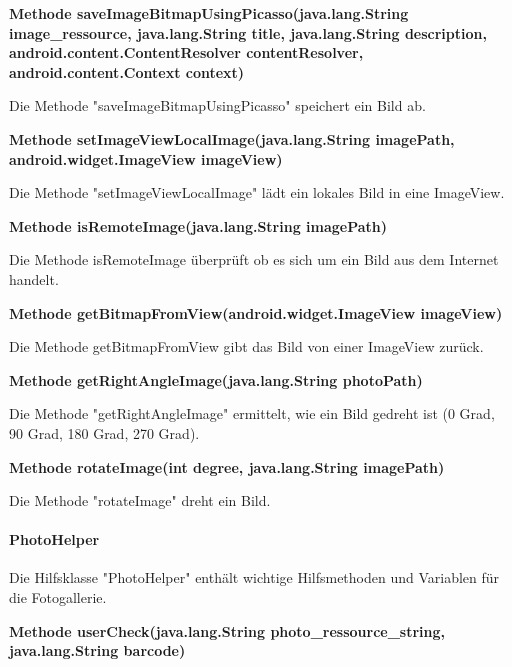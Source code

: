 \documentclass{scrartcl}
\begin{document}
\noindent\textbf{Methode saveImageBitmapUsingPicasso(java.lang.String image\_ressource, \newline 
java.lang.String title,
java.lang.String description, \newline 
android.content.ContentResolver contentResolver, \newline 
android.content.Context context)}

\noindent Die Methode "saveImageBitmapUsingPicasso" speichert ein Bild ab. \newline 

\noindent\textbf{Methode setImageViewLocalImage(java.lang.String imagePath, \newline android.widget.ImageView imageView)}

\noindent Die Methode "setImageViewLocalImage" lädt ein lokales Bild in eine ImageView. \newline 

\noindent\textbf{Methode isRemoteImage(java.lang.String imagePath)}

\noindent Die Methode isRemoteImage überprüft ob es sich um ein Bild aus dem Internet handelt. \newline 

\noindent\textbf{Methode getBitmapFromView(android.widget.ImageView imageView)}

\noindent Die Methode getBitmapFromView gibt das Bild von einer ImageView zurück. \newline 

\noindent\textbf{Methode getRightAngleImage(java.lang.String photoPath)}

\noindent Die Methode "getRightAngleImage" ermittelt, wie ein Bild gedreht ist (0 Grad, 90 Grad, 180 Grad, 270 Grad). \newline 

\noindent\textbf{Methode rotateImage(int degree,                                     java.lang.String imagePath)}

\noindent Die Methode "rotateImage" dreht ein Bild. \newline

\paragraph{PhotoHelper}
Die Hilfsklasse "PhotoHelper" enthält wichtige Hilfsmethoden und Variablen für die Fotogallerie. \newline 

\noindent\textbf{Methode userCheck(java.lang.String photo\_ressource\_string, \newline       java.lang.String barcode)}
\end{document}
